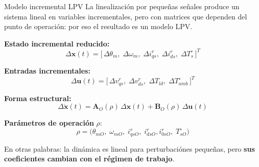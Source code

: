 \documentclass[aspectratio=169,t]{beamer}
\begin{document}
\begin{frame}{Modelo incremental LPV}
{\small\color{uncGray}La linealización por pequeñas señales produce un sistema lineal en variables incrementales, pero con matrices que dependen del punto de operación: por eso el resultado es un modelo LPV.}\par
\vspace{3mm}

\textbf{Estado incremental reducido:}
\begin{equation*}
\Delta\bm{x}(t)=
\big[\,\Delta\theta_m,\;\Delta\omega_m,\;\Delta i_{qs}^{r},\;\Delta i_{ds}^{r},\;\Delta T_s^\circ\,\big]^T
\end{equation*}

\textbf{Entradas incrementales:}
\begin{equation*}
\Delta\bm{u}(t)=
\big[\,\Delta v_{qs}^{r},\;\Delta v_{ds}^{r},\;\Delta T_{ld},\;\Delta T_{amb}^\circ\,\big]^T
\end{equation*}

\textbf{Forma estructural:}
\begin{equation*}
\Delta\dot{\bm{x}}(t)=\bm{A}_O(\rho)\,\Delta\bm{x}(t)+\bm{B}_O(\rho)\,\Delta\bm{u}(t)
\end{equation*}

\textbf{Parámetros de operación} $\rho$:
\begin{equation*}
\rho=\big(\theta_{mO},\;\omega_{mO},\;i_{qsO}^{r},\;i_{dsO}^{r},i^r_{0sO},\;T_{sO}^\circ\big)
\end{equation*}

{\small En otras palabras: la dinámica es lineal para perturbaciónes pequeñas, pero \textbf{sus coeficientes cambian con el régimen de trabajo}.}
\end{frame}
\end{document}
